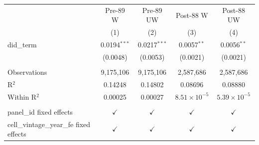 
\begingroup
\centering
\begin{tabular}{lcccc}
   \toprule
                                            & Pre-89 W       & Pre-89 UW      & Post-88 W             & Post-88 UW \\   
                                            & (1)            & (2)            & (3)                   & (4)\\  
   \midrule 
   did\_term                                & 0.0194$^{***}$ & 0.0217$^{***}$ & 0.0057$^{**}$         & 0.0056$^{**}$\\   
                                            & (0.0048)       & (0.0053)       & (0.0021)              & (0.0021)\\   
    \\
   Observations                             & 9,175,106      & 9,175,106      & 2,587,686             & 2,587,686\\  
   R$^2$                                    & 0.14248        & 0.14802        & 0.08696               & 0.08880\\  
   Within R$^2$                             & 0.00025        & 0.00027        & $8.51\times 10^{-5}$  & $5.39\times 10^{-5}$\\   
    \\
   panel\_id fixed effects                  & $\checkmark$   & $\checkmark$   & $\checkmark$          & $\checkmark$\\   
   cell\_vintage\_year\_fe fixed effects    & $\checkmark$   & $\checkmark$   & $\checkmark$          & $\checkmark$\\   
   \bottomrule
\end{tabular}
\par\endgroup


